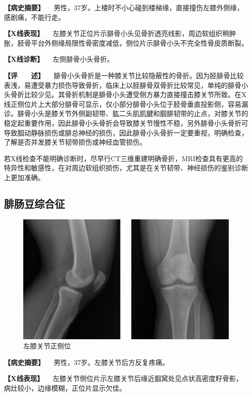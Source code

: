 \textbf{【病史摘要】}
　男性，37岁。上楼时不小心碰到楼梯缘，直接撞伤左膝外侧缘，感剧痛，不能行走。

\textbf{【X线表现】}
　左膝关节正位片示腓骨小头见骨折透亮线影，周边软组织稍肿胀，胫骨平台外侧缘局限性骨密度减低，侧位片示腓骨小头不完全性骨皮质断裂。

\textbf{【X线诊断】} 　左侧腓骨小头骨折。

\textbf{【评　　述】}
　腓骨小头骨折是一种膝关节比较隐蔽性的骨折。因为胫腓骨比较表浅，易遭受暴力损伤导致骨折，临床上以胫腓骨双骨折比较常见，单纯的腓骨小头骨折比较少见。其骨折机制是腓骨小头遭受侧方暴力直接撞击膝关节所致。在X线正侧位片上大部分腓骨可显示，仅小部分腓骨小头位于胫骨垂直投影侧，容易漏诊。腓骨小头是膝关节外侧副韧带、肱二头肌肌腱和腘腓韧带的止点，对膝关节的稳定起重要作用，因此腓骨小头骨折会导致膝关节慢性不稳，另外腓骨小头骨折可导致腘动静脉损伤或腓总神经的损伤，因此腓骨小头骨折一定要重视，明确检查，了解是否并发膝关节韧带损伤或神经血管损伤。

若X线检查不能明确诊断时，尽早行CT三维重建明确骨折，MRI检查具有更高的特异性和敏感性，在对周边软组织损伤，尤其是在关节韧带、神经损伤的鉴别诊断上更加准确。

\subsection{腓肠豆综合征}

\begin{figure}[!htbp]
 \centering
 \includegraphics{./images/Image00052.jpg}
 \captionsetup{justification=centering}
 \caption{左膝关节正侧位}
 \label{fig2-3-25}
  \end{figure} 

\textbf{【病史摘要】} 　男性，37岁。左膝关节后方反复疼痛。

\textbf{【X线表现】}
　左膝关节侧位片示左膝关节后缘近腘窝处见点状高密度籽骨影，病灶较小，边缘模糊，正位片显示欠佳。

